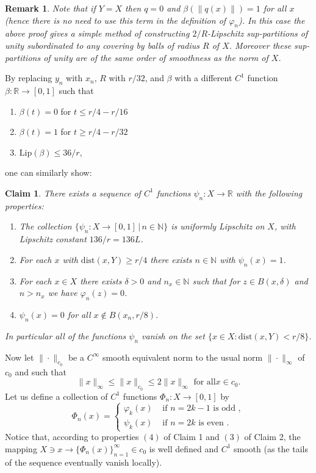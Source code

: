 \documentclass[11pt]{amsproc}%
\theoremstyle{plain}
\newtheorem{claim}{Claim}
\newtheorem{remark}{Remark}
\numberwithin{equation}{section}
\begin{document}
\bigskip


\begin{remark}
{\em Note that if $Y=X$ then $q=0$ and $\beta(\|q(x)\|)=1$ for all
$x$ (hence there is no need to use this term in the definition of
$\varphi_n$). In this case the above proof gives a simple method
of constructing $2/R$-Lipschitz sup-partitions of unity
subordinated to any covering by balls of radius $R$ of $X$.
Moreover these sup-partitions of unity are of the same order of
smoothness as the norm of $X$.}
\end{remark}


\bigskip


By replacing $y_n$ with $x_n$, $R$ with $r/32$, and $\beta$ with a
different $C^1$ function $\beta:\mathbb{R}\to [0,1]$ such that
\begin{enumerate}
\item[{}] $\beta(t)=0$ for $t\leq r/4 - r/16$
\item[{}] $\beta(t)=1$ for $t\geq r/4 - r/32$
\item[{}] $\textrm{Lip}(\beta)\leq 36/r$,
\end{enumerate}
one can similarly show:
\begin{claim}
There exists a sequence of $C^1$ functions $\psi_{n}
:X\to\mathbb{R}$ with the following properties:
\begin{enumerate}
\item The collection $\{\psi_{n} :X\to[0,1] \, | \, n\in\mathbb{N}\}$ is
uniformly Lipschitz on $X$, with Lipschitz constant $136/r=136L$.
\item For each $x$ with $\textrm{dist}(x,Y)\geq r/4$ there exists $n\in\mathbb{N}$ with
$\psi_{n}(x)=1$.
\item For each $x\in X$ there exists $\delta>0$ and $n_{x}\in\mathbb{N}$ such
that for $z\in B(x, \delta)$ and $n>n_{x}$ we have $\varphi_{n}
(z)=0$.
\item $\psi_{n}(x)=0$ for all $x\notin B(x_n, r/8)$.
\end{enumerate}
In particular all of the functions $\psi_n$ vanish on the set
$\{x\in X : \textrm{dist}(x, Y)<r/8\}$.
\end{claim}

Now let $\|\cdot\|_{c_0}$ be a $C^{\infty}$ smooth equivalent norm
to the usual norm $\|\cdot\|_{\infty}$ of $c_0$ and such that
    $$
\|x\|_{\infty}\leq\|x\|_{c_0}\leq 2\|x\|_{\infty} \textrm{ for all
} x\in c_0.
    $$
Let us define a collection of $C^1$ functions $\Phi_n:X\to [0,1]$
by
    $$
\Phi_n(x)=
  \begin{cases}
    \varphi_{k}(x) & \text{ if } n=2k-1 \text{ is odd },  \\
    \psi_{k}(x) & \text{ if } n=2k \text{ is even }.
  \end{cases}
    $$
Notice that, according to properties $(4)$ of Claim 1 and $(3)$ of
Claim 2, the mapping $X\ni x\to \{\Phi_{n}(x)\}_{n=1}^{\infty}\in
c_0$ is well defined and $C^1$ smooth (as the tails of the
sequence eventually vanish locally).
\end{document}
